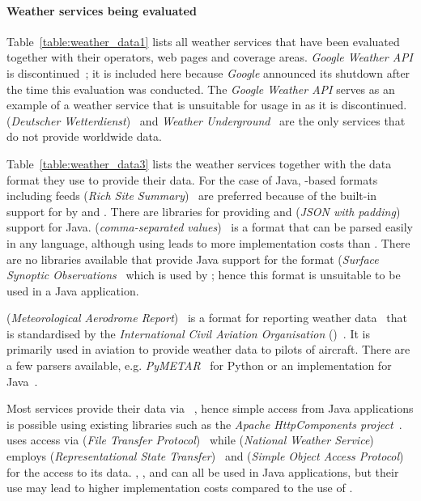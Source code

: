 \paragraph{Weather services being evaluated}

Table~\ref{table:weather_data1} lists all weather services that have been evaluated together with their operators, web pages and coverage areas. \emph{Google Weather API} is discontinued~\cite{google_weather}; it is included here because \emph{Google} announced its shutdown after the time this evaluation was conducted. The \emph{Google Weather \acs{API}} serves as an example of a weather service that is unsuitable for usage in \smarthomeweather as it is discontinued.  (\emph{Deutscher Wetterdienst})~\cite{dwd} and \emph{Weather Underground}~\cite{weather_underground} are the only services that do not provide worldwide data.

Table~\ref{table:weather_data3} lists the  weather services together with the data format they use to provide their data. For the case of Java, -based formats including  feeds (\emph{Rich Site Summary})~\cite{RSS} are preferred because of the built-in support for  by  and . There are libraries for providing  and  (\emph{\acs{JSON} with padding})~\cite{jsonp} support for Java.  (\emph{comma-separated values})~\cite{rfc4180} is a format that can be parsed easily in any language, although using  leads to more implementation costs than . There are no libraries available that provide Java support for the  format (\emph{Surface Synoptic Observations}~\cite{SYNOP} which is used by ; hence this format is unsuitable to be used in a Java application.

 (\emph{Meteorological Aerodrome Report})~\cite{metar} is a format for reporting weather data~\cite{metar} that is standardised by the \emph{International Civil Aviation Organisation} ()~\cite{ICAO}. It is primarily used in aviation to provide weather data to pilots of aircraft. There are a few parsers available, e.g. \emph{PyMETAR}~\cite{pymetar} for Python or an implementation for Java~\cite{metar-java}.

Most services provide their data via ~\cite{rfc2616}, hence simple access from Java applications is possible using existing libraries such as the \emph{Apache HttpComponents project}~\cite{apache_hc}.  uses access via  (\emph{File Transfer Protocol})~\cite{rfc959} while  (\emph{National Weather Service}) employs  (\emph{Representational State Transfer})~\cite{REST} and  (\emph{Simple Object Access Protocol})~\cite{SOAP} for the access to its data. , , and  can all be used in Java applications, but their use may lead to higher implementation costs compared to the use of .

